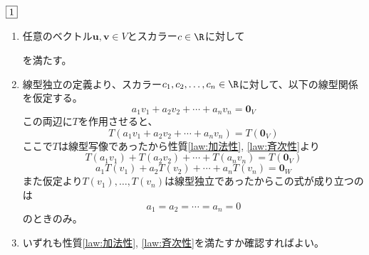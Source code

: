 \begin{souanswer} %
	$\fbox{1}$
\begin{enumerate}
	\item 任意のベクトル$\bm{u}, \bm{v}\in V$とスカラー$c\in \R$に対して
	を満たす。
	\item 線型独立の定義より、スカラー$c_1, c_2, \ldots, c_n\in \R$に対して、以下の線型関係を仮定する。
\begin{equation*}
	a_1v_1+ a_2v_2+ \cdots+ a_nv_n= \bm{0}_V
\end{equation*}
	この両辺に$T$を作用させると、
\begin{equation*}
	T(a_1v_1+ a_2v_2+ \cdots+ a_nv_n)= T(\bm{0}_V)
\end{equation*}
	ここで$T$は線型写像であったから性質\ref{law:加法性}, \ref{law:斉次性}より
\begin{equation*}
	T(a_1v_1)+ T(a_2v_2)+ \cdots+ T(a_nv_n)= T(\bm{0}_V)
\end{equation*}
\begin{equation*}
	a_1T(v_1)+ a_2T(v_2)+ \cdots+ a_nT(v_n)= \bm{0}_W
\end{equation*}
	また仮定より$T(v_1), \ldots, T(v_n)$は線型独立であったからこの式が成り立つのは
\begin{equation*}
	a_1= a_2= \cdots= a_n= 0
\end{equation*}
	のときのみ。
	\item いずれも性質\ref{law:加法性}, \ref{law:斉次性}を満たすか確認すればよい。
\end{enumerate}
\end{souanswer}
